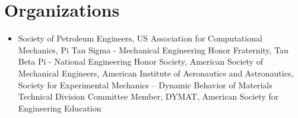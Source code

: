 \section*{Organizations}

\begin{itemize}
    \item Society of Petroleum Engineers, US Association for Computational Mechanics, Pi Tau Sigma - Mechanical Engineering Honor Fraternity, Tau Beta Pi - National Engineering Honor Society, American Society of Mechanical Engineers, American Institute of Aeronautics and Astronautics, Society for Experimental Mechanics -- Dynamic Behavior of Materials Technical Division Committee Member, DYMAT, American Society for Engineering Education
\end{itemize}
